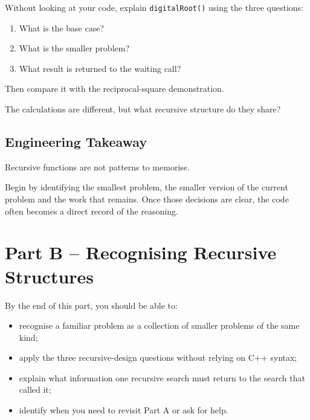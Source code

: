 \documentclass{csc2059practical}
\begin{document}
\begin{reflectionbox}
Without looking at your code, explain \texttt{digitalRoot()} using the
three questions:

\begin{enumerate}
    \item What is the base case?
    \item What is the smaller problem?
    \item What result is returned to the waiting call?
\end{enumerate}

Then compare it with the reciprocal-square demonstration.

The calculations are different, but what recursive structure do they share?
\end{reflectionbox}

\subsection{Engineering Takeaway}

\begin{importantnote}
Recursive functions are not patterns to memorise.

Begin by identifying the smallest problem, the smaller version of the current
problem and the work that remains. Once those decisions are clear, the code
often becomes a direct record of the reasoning.
\end{importantnote}



\section{Part B -- Recognising Recursive Structures}

\begin{learningoutcomes}
By the end of this part, you should be able to:

\begin{itemize}
    \item recognise a familiar problem as a collection of smaller problems of
          the same kind;
    \item apply the three recursive-design questions without relying on C++
          syntax;
    \item explain what information one recursive search must return to the
          search that called it;
    \item identify when you need to revisit Part A or ask for help.
\end{itemize}
\end{learningoutcomes}
\end{document}
